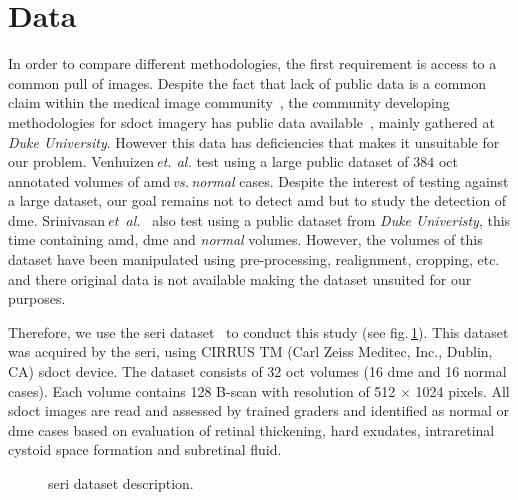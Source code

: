 \graphicspath{ {./content/method/figures/} }

\section{Data}\label{sec:data}
In order to compare different methodologies, the first requirement is access to a common pull of images.
Despite the fact that lack of public data is a common claim within the medical image community~\cite{giger2008anniversary}, the community developing methodologies for \gls{sdoct} imagery has public data available~\cite{DUKEDATA_a,DUKEDATA_b}, mainly gathered at \emph{Duke University}.
However this data has deficiencies that makes it unsuitable for our problem.
Venhuizen\,\emph{et. al.} test using a large public dataset of $384$ \gls{oct} annotated volumes of \gls{amd}\,\emph{vs.\,normal} cases.
Despite the interest of testing against a large dataset, our goal remains not to detect \gls{amd} but to study the detection of \gls{dme}.
Srinivasan\,\textit{et~al.}~\cite{Srinivasan2014} also test using a public dataset from \emph{Duke Univeristy}, this time containing \gls{amd}, \gls{dme} and \emph{normal} volumes.
However, the volumes of this dataset have been manipulated using pre-processing, realignment, cropping, etc. and there original data is not available making the dataset unsuited for our purposes.

Therefore, we use the \gls{seri} dataset~\cite{SERIDATA} to conduct this study (see fig.\,\ref{fig:bbdd}).
This dataset was acquired by the \gls{seri}, using CIRRUS TM (Carl Zeiss Meditec, Inc., Dublin, CA) \gls{sdoct} device.
The dataset consists of 32 \gls{oct} volumes (16 \gls{dme} and 16 normal cases).
Each volume contains 128 B-scan with resolution of 512 $\times$ 1024 pixels.  All \gls{sdoct} images are read and assessed by trained graders and identified as normal or \gls{dme} cases based on evaluation of retinal thickening, hard exudates, intraretinal cystoid space formation and subretinal fluid.

\begin{figure}
    \caption{\gls{seri} dataset description.}
  \label{fig:bbdd}
\end{figure}
